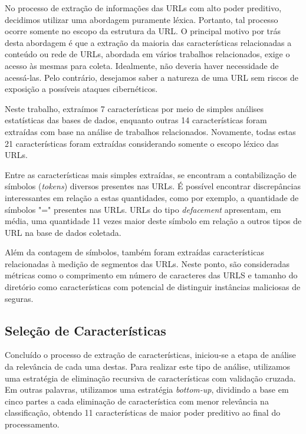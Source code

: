 \documentclass[manuscript,screen,review]{acmart}
\begin{document}
No processo de extração de informações das URLs com alto poder preditivo, decidimos utilizar uma abordagem puramente léxica. Portanto, tal processo ocorre somente no escopo da estrutura da URL. O principal motivo por trás desta abordagem é que a extração da maioria das características relacionadas a conteúdo ou rede de URLs, abordada em vários trabalhos relacionados, exige o acesso às mesmas para coleta. Idealmente, não deveria haver necessidade de acessá-las. Pelo contrário, desejamos saber a natureza de uma URL sem riscos de exposição a possíveis ataques cibernéticos.

Neste trabalho, extraímos 7 características por meio de simples análises estatísticas das bases de dados, enquanto outras 14 características foram extraídas com base na análise de trabalhos relacionados. Novamente, todas estas 21 características foram extraídas considerando somente o escopo léxico das URLs.

Entre as características mais simples extraídas, se encontram a contabilização de símbolos (\emph{tokens}) diversos presentes nas URLs. É possível encontrar discrepâncias interessantes em relação a estas quantidades, como por exemplo, a quantidade de símbolos "=" \hspace{0.1cm}presentes nas URLs. URLs do tipo \emph{defacement} apresentam, em média, uma quantidade 11 vezes maior deste símbolo em relação a outros tipos de URL na base de dados coletada.

Além da contagem de símbolos, também foram extraídas características relacionadas à medição de segmentos das URLs. Neste ponto, são consideradas métricas como o comprimento em número de caracteres das URLS e tamanho do diretório como características com potencial de distinguir instâncias maliciosas de seguras.

\subsection{Seleção de Características}

Concluído o processo de extração de características, iniciou-se a etapa de análise da relevância de cada uma destas. Para realizar este tipo de análise, utilizamos uma estratégia de eliminação recursiva de características com validação cruzada. Em outras palavras, utilizamos uma estratégia \emph{bottom-up}, dividindo a base em cinco partes a cada eliminação de característica com menor relevância na classificação, obtendo 11 características de maior poder preditivo ao final do processamento.
\end{document}
